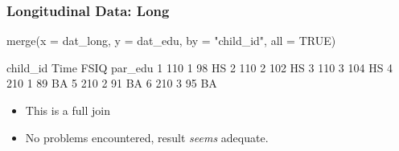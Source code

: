 \documentclass[10pt,american]{beamer}
\renewenvironment{Schunk}{}{}
\renewenvironment{Sinput}{}{}
\begin{document}
\begin{frame}
\frametitle{Longitudinal Data: Long}

\begin{Schunk}
\begin{Sinput}
 merge(x = dat_long, y = dat_edu, by = "child_id", all = TRUE)
\end{Sinput}
\begin{Soutput}
  child_id Time FSIQ par_edu
1      110    1   98      HS
2      110    2  102      HS
3      110    3  104      HS
4      210    1   89      BA
5      210    2   91      BA
6      210    3   95      BA
\end{Soutput}
\end{Schunk}
\begin{itemize}
  \item This is a full join
  \item No problems encountered, result \emph{seems} adequate. 
\end{itemize} 
\end{frame}
\end{document}
